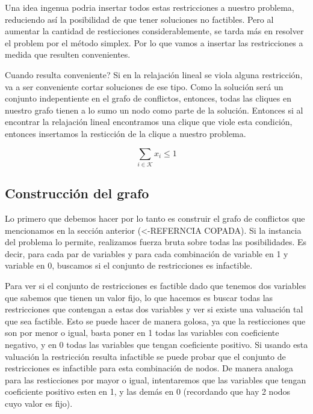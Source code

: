 Una idea ingenua podria insertar todos estas restricciones a nuestro problema, reduciendo as\'i la posibilidad de que tener soluciones no factibles.
Pero al aumentar la cantidad de resticciones considerablemente, se tarda m\'as en resolver el problem por el m\'etodo simplex. Por lo que vamos
a insertar las restricciones a medida que resulten convenientes.

Cuando resulta conveniente? Si en la relajaci\'on lineal se viola alguna restricci\'on, va a ser conveniente cortar soluciones de ese tipo.
Como la soluci\'on ser\'a un conjunto indepentiente en el grafo de conflictos, entonces, todas las cliques en nuestro grafo tienen a lo sumo
un nodo como parte de la soluci\'on. Entonces si al encontrar la relajaci\'on lineal encontramos una clique que viole esta condici\'on, entonces
insertamos la resticci\'on de la clique a nuestro problema.

\begin{equation}
\sum\limits_{i \in \mathcal{K}} x_i \leq 1
\end{equation}

\bigskip
\subsection{Construcci\'on del grafo}

Lo primero que debemos hacer por lo tanto es construir el grafo de conflictos que mencionamos en la secci\'on anterior (<-REFERNCIA COPADA).
Si la instancia del problema lo permite, realizamos fuerza bruta sobre todas las posibilidades. Es decir, para cada par de variables y para cada 
combinaci\'on de variable en 1 y variable en 0, buscamos si el conjunto de restricciones es infactible.

Para ver si el conjunto de restricciones es factible dado que tenemos dos variables que sabemos que tienen un valor fijo, lo que hacemos es buscar
todas las restricciones que contengan a estas dos variables y ver si existe una valuaci\'on tal que sea factible. Esto se puede hacer de manera
golosa, ya que la resticciones que son por menor o igual, basta poner en 1 todas las variables con coeficiente negativo, y en 0 todas las variables que tengan coeficiente positivo. Si usando
esta valuaci\'on la restricci\'on resulta infactible se puede probar que el conjunto de restricciones es infactible para esta combinaci\'on de nodos. De manera analoga para las resticciones
 por mayor o igual, intentaremos que las variables que tengan coeficiente positivo esten en 1, y las dem\'as en 0 (recordando que hay 2 nodos cuyo valor es fijo).

